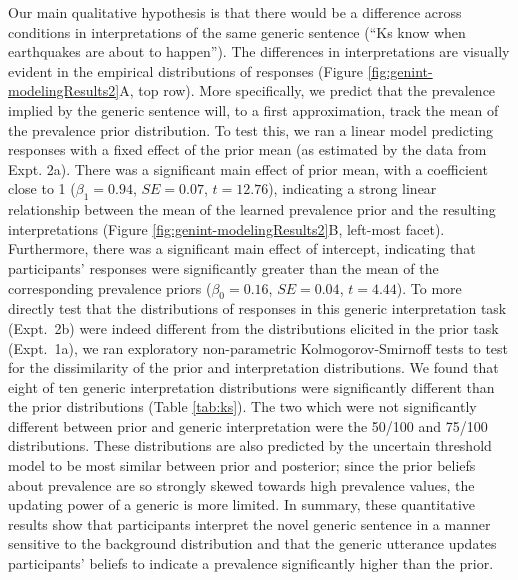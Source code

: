 \documentclass[floatsintext,doc]{apa6}
\begin{document}
Our main qualitative hypothesis is that there would be a difference across conditions in interpretations of the same generic sentence (\enquote{Ks know when earthquakes are about to happen}).
The differences in interpretations are visually evident in the empirical distributions of responses (Figure \ref{fig:genint-modelingResults2}A, top row).
More specifically, we predict that the prevalence implied by the generic sentence will, to a first approximation, track the mean of the prevalence prior distribution.
To test this, we ran a linear model predicting responses with a fixed effect of the prior mean (as estimated by the data from Expt. 2a).
There was a significant main effect of prior mean, with a coefficient close to 1 (\(\beta_1 = 0.94\), \(SE=0.07\), \(t = 12.76\)), indicating a strong linear relationship between the mean of the learned prevalence prior and the resulting interpretations (Figure \ref{fig:genint-modelingResults2}B, left-most facet).
Furthermore, there was a significant main effect of intercept, indicating that participants' responses were significantly greater than the mean of the corresponding prevalence priors (\(\beta_0 = 0.16\), \(SE=0.04\), \(t = 4.44\)).
To more directly test that the distributions of responses in this generic interpretation task (Expt.~2b) were indeed different from the distributions elicited in the prior task (Expt.~1a), we ran exploratory non-parametric Kolmogorov-Smirnoff tests to test for the dissimilarity of the prior and interpretation distributions.  
We found that eight of ten generic interpretation distributions were significantly different than the prior distributions (Table \ref{tab:ks}).
The two which were not significantly different between prior and generic interpretation were the 50/100 and 75/100 distributions. These distributions are also predicted by the uncertain threshold model to be most similar between prior and posterior; since the prior beliefs about prevalence are so strongly skewed towards high prevalence values, the updating power of a generic is more limited.
In summary, these quantitative results show that participants interpret the novel generic sentence in a manner sensitive to the background distribution and that the generic utterance updates participants' beliefs to indicate a prevalence significantly higher than the prior.
\end{document}
